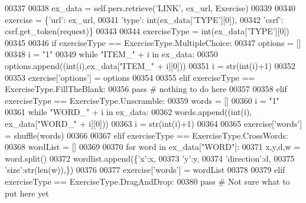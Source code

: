 \begin{DoxyCode}
00337 
00338         ex\_data = self.pers.retrieve(\textcolor{stringliteral}{'LINK'}, ex\_url, Exercise)
00339 
00340         exercise = \{\textcolor{stringliteral}{'url'}: ex\_url, 
00341                     \textcolor{stringliteral}{'type'}: int(ex\_data[\textcolor{stringliteral}{'TYPE'}][0]),
00342                     \textcolor{stringliteral}{'csrf'}: csrf.get\_token(request)\}
00343 
00344         exerciseType = int(ex\_data[\textcolor{stringliteral}{'TYPE'}][0])
00345 
00346         \textcolor{keywordflow}{if} exerciseType == ExerciseType.MultipleChoice:
00347             options = []
00348             i = \textcolor{stringliteral}{"1"}
00349             \textcolor{keywordflow}{while} \textcolor{stringliteral}{"ITEM\_"} + i \textcolor{keywordflow}{in} ex\_data:
00350                 options.append((int(i),ex\_data[\textcolor{stringliteral}{"ITEM\_"} + i][0]))
00351                 i = str(int(i)+1)
00352 
00353             exercise[\textcolor{stringliteral}{'options'}] = options
00354 
00355         \textcolor{keywordflow}{elif} exerciseType == ExerciseType.FillTheBlank:
00356             \textcolor{keywordflow}{pass} \textcolor{comment}{# nothing to do here}
00357 
00358         \textcolor{keywordflow}{elif} exerciseType == ExerciseType.Unscramble:
00359             words = []
00360             i = \textcolor{stringliteral}{"1"}
00361             \textcolor{keywordflow}{while} \textcolor{stringliteral}{"WORD\_"} + i \textcolor{keywordflow}{in} ex\_data:
00362                 words.append((int(i), ex\_data[\textcolor{stringliteral}{"WORD\_"} + i][0]))
00363                 i = str(int(i)+1)
00364 
00365             exercise[\textcolor{stringliteral}{'words'}] = shuffle(words)
00366 
00367         \textcolor{keywordflow}{elif} exerciseType == ExerciseType.CrossWords:
00368             wordList = []
00369             
00370             \textcolor{keywordflow}{for} word \textcolor{keywordflow}{in} ex\_data[\textcolor{stringliteral}{"WORD"}]:
00371                 x,y,d,w = word.split()
00372                 wordlist.append(\{\textcolor{stringliteral}{'x'}:x,
00373                                  \textcolor{stringliteral}{'y'}:y,
00374                                  \textcolor{stringliteral}{'direction'}:d,
00375                                  \textcolor{stringliteral}{'size'}:str(len(w)),\})
00376 
00377             exercise[\textcolor{stringliteral}{'words'}] = wordList
00378 
00379         \textcolor{keywordflow}{elif} exerciseType == ExerciseType.DragAndDrop:
00380             \textcolor{keywordflow}{pass} \textcolor{comment}{# Not sure what to put here yet}

\end{DoxyCode}

